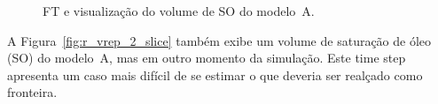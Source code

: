 \begin{figure}[h]
	\centering
	\caption{FT e visualização do volume de SO do modelo~A.}
	\label{fig:r_vrep}
\end{figure}

	A Figura~\ref{fig:r_vrep_2_slice} também exibe um volume de saturação de óleo (SO) do modelo~A, mas em outro momento da simulação. Este time step apresenta um caso mais difícil de se estimar o que deveria ser realçado como fronteira.
	
